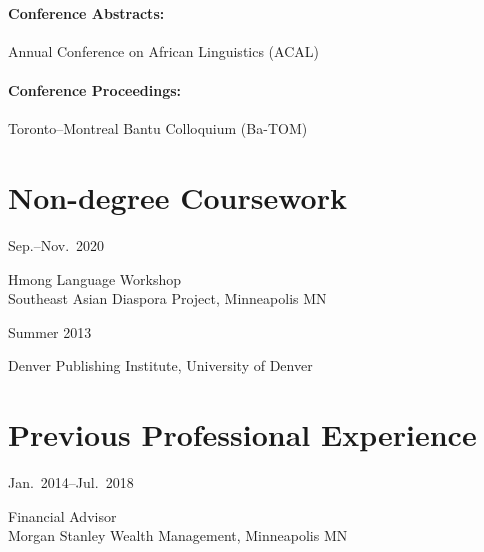\documentclass[11pt,oneside,DIV=calc,parskip=off]{scrarticle} %
\newlength{\leftcolwidth}
\newlength{\mycolspace}
\newlength{\rightcolwidth}
\newlength{\spacingbefore}
\newlength{\spacingafter}
\newcommand{\mytwocol}[2]{%
	\vspace{\spacingbefore}%
	\begin{minipage}[t]{\leftcolwidth}%
		\strut#1%
	\end{minipage}%
	\hspace{\mycolspace}%
	\begin{minipage}[t]{\rightcolwidth}%
		\strut#2%
	\end{minipage}%
	\vspace{\spacingafter}\par%
	}
\newcommand{\cvline}[2]{%
	\mytwocol{#1}{#2}%
	}
\begin{document}
\paragraph{Conference Abstracts:} Annual Conference on African Linguistics (ACAL)
\paragraph{Conference Proceedings:} Toronto--Montreal Bantu Colloquium (Ba-TOM)

\section{Non-degree Coursework}
\cvline{Sep.--Nov.\ 2020}{Hmong Language Workshop\\Southeast Asian Diaspora Project, Minneapolis MN}
\cvline{Summer 2013}{Denver Publishing Institute, University of Denver}

\section{Previous Professional Experience}
\cvline{Jan.\ 2014--Jul.\ 2018}{Financial Advisor\\Morgan Stanley Wealth Management, Minneapolis MN}

\end{document}

